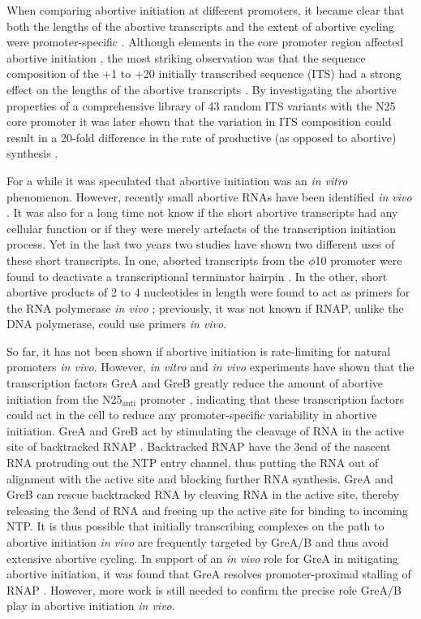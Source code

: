 When comparing abortive initiation at different promoters, it became clear that
both the lengths of the abortive transcripts and the extent of abortive cycling
were promoter-specific \cite{hsu_vitro_2003}. Although elements in the core
promoter region affected abortive initiation \cite{vo_vitro_2003}, the most
striking observation was that the sequence composition of the +1 to +20
initially transcribed sequence (ITS) had a strong effect on the lengths of the
abortive transcripts \cite{hsu_vitro_2003}. By investigating the abortive
properties of a comprehensive library of 43 random ITS variants with the N25
core promoter it was later shown that the variation in ITS composition could
result in a 20-fold difference in the rate of productive (as opposed to
abortive) synthesis \cite{hsu_initial_2006}. 

For a while it was speculated that abortive initiation was an \textit{in vitro}
phenomenon. However, recently small abortive RNAs have been identified
\textit{in vivo} \cite{goldman_direct_2009}. It was also for a long time not
know if the short abortive transcripts had any cellular function or if they
were merely artefacts of the transcription initiation process. Yet in the last
two years two studies have shown two different uses of these short transcripts.
In one, aborted transcripts from the $\phi$10 promoter were found to deactivate
 a transcriptional terminator hairpin \cite{lee_tiny_2010}. In the other,
short abortive products of 2 to 4 nucleotides in length were found to act as
primers for the RNA polymerase \textit{in vivo} \cite{goldman_nanornas_2011};
previously, it was not known if RNAP, unlike the DNA polymerase, could use
primers \textit{in vivo}.

So far, it has not been shown if abortive initiation is rate-limiting for
natural promoters \textit{in vivo}. However, \textit{in vitro} and \textit{in
vivo} experiments have shown that the transcription factors GreA and GreB
greatly reduce the amount of abortive initiation from the N25$_{\text{anti}}$
promoter \cite{hsu_escherichia_1995}, indicating that these transcription
factors could act in the cell to reduce any promoter-specific variability in
abortive initiation. GreA and GreB act by stimulating the cleavage of RNA in
the active site of backtracked RNAP \cite{toulme_grea_2000}. Backtracked RNAP
have the 3\p end of the nascent RNA protruding out the NTP entry channel, thus
putting the RNA out of alignment with the active site and blocking further RNA
synthesis. GreA and GreB can rescue backtracked RNA by cleaving RNA in the
active site, thereby releasing the 3\p end of RNA and freeing up the active
site for binding to incoming NTP. It is thus possible that initially
transcribing complexes on the path to abortive initiation \textit{in vivo} are
frequently targeted by GreA/B and thus avoid extensive abortive cycling.  In
support of an \textit{in vivo} role for GreA in mitigating abortive initiation,
it was found that GreA resolves promoter-proximal stalling of RNAP
\cite{kusuya_transcription_2011}. However, more work is still needed to confirm
the precise role GreA/B play in abortive initiation \textit{in vivo}.

